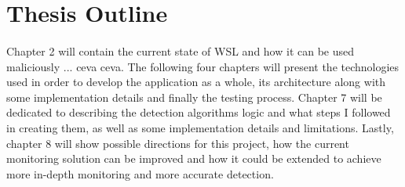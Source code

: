     \section{Thesis Outline}
        \paragraph{}
        Chapter 2 will contain the current state of WSL and how it can be used maliciously ... ceva ceva. The following four chapters will present the
        technologies used in order to develop the application as a whole, its architecture along with some implementation details and finally the
        testing process. Chapter 7 will be dedicated to describing the detection algorithms logic and what steps I followed in creating them, as
        well as some implementation details and limitations. Lastly, chapter 8 will show possible directions for this project, how the current
        monitoring solution can be improved and how it could be extended to achieve more in-depth monitoring and more accurate detection.